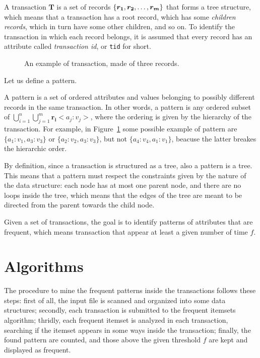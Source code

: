 \documentclass{acm_proc_article-sp-sigmod09}
\begin{document}
A transaction $\boldsymbol{T}$ is a set of records $\{\boldsymbol{r_1}, \boldsymbol{r_2}, \text{\dots}, \boldsymbol{r_m}\}$ that forms a tree structure, which means that a transaction has a root record, which has some \emph{children records}, which in turn have some other children, and so on. To identify the transaction in which each record belongs, it is assumed that every record has an attribute called \emph{transaction id}, or \texttt{tid} for short.

\begin{figure}
\centering
{}
\caption{An example of transaction, made of three records.}
\label{fig:transaction}
\end{figure}

Let us define a pattern.
\begin{definition}
A pattern is a set of ordered attributes and values belonging to possibly different records in the same transaction. In other words, a pattern is any ordered subset of $\bigcup\limits_{i=1}^{n} \bigcup\limits_{j=1}^{m} \boldsymbol{r_i}<a_j \colon v_j>$, where the ordering is given by the hierarchy of the transaction. For example, in Figure~\ref{fig:transaction} some possible example of pattern are $\{a_1 \colon v_1, a_3 \colon v_3\}$ or $\{a_2 \colon v_2, a_3 \colon v_3\}$, but not $\{a_4 \colon v_4, a_1 \colon v_1\}$, beacuse the latter breakes the hierarchic order.

By definition, since a transaction is structured as a tree, also a pattern is a tree. This means that a pattern must respect the constraints given by the nature of the data structure: each node has at most one parent node, and there are no loops inside the tree, which means that the edges of the tree are meant to be directed from the parent towards the child node.
\end{definition}

Given a set of transactions, the goal is to identify patterns of attributes that are frequent, which means transaction that appear at least a given number of time $f$.

\section{Algorithms}
The procedure to mine the frequent patterns inside the transactions follows these steps: first of all, the input file is scanned and organized into some data structures; secondly, each transaction is submitted to the frequent itemsets algorithm; thridly, each frequent itemset is analyzed in each transaction, searching if the itemset appears in some ways inside the transaction; finally, the found pattern are counted, and those above the given threshold $f$ are kept and displayed as frequent.
\end{document}
